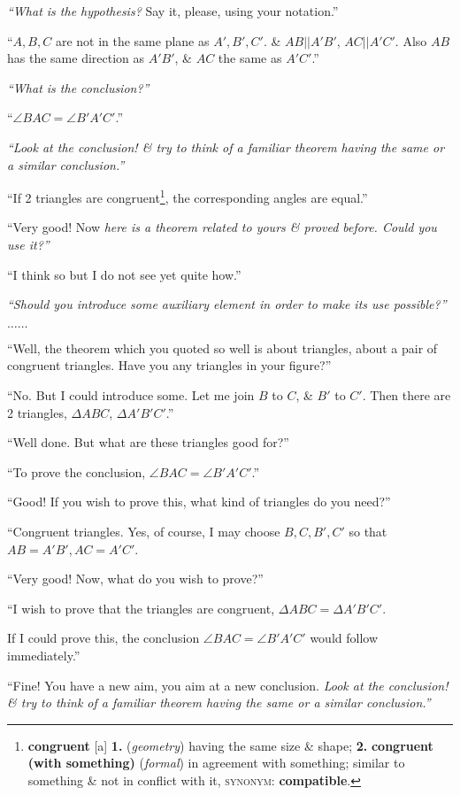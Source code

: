 \documentclass[oneside]{book}
\numberwithin{equation}{section}
\begin{document}
\textit{``What is the hypothesis?} Say it, please, using your notation.''

``$A,B,C$ are not in the same plane as $A',B',C'$. \& $AB||A'B'$, $AC||A'C'$. Also $AB$ has the same direction as $A'B'$, \& $AC$ the same as $A'C'$.''

\textit{``What is the conclusion?''}

``$\angle BAC = \angle B'A'C'$.''

\textit{``Look at the conclusion! \& try to think of a familiar theorem having the same or a similar conclusion.''}

``If 2 triangles are congruent\footnote{\textbf{congruent} [a] \textbf{1.} (\textit{geometry}) having the same size \& shape; \textbf{2.} \textbf{congruent (with something)} (\textit{formal}) in agreement with something; similar to something \& not in conflict with it, \textsc{synonym}: \textbf{compatible}.}, the corresponding angles are equal.''

``Very good! Now \textit{here is a theorem related to yours \& proved before. Could you use it?''}

``I think so but I do not see yet quite how.''

\textit{``Should you introduce some auxiliary element in order to make its use possible?''}

$\ldots\ldots$

``Well, the theorem which you quoted so well is about triangles, about a pair of congruent triangles. Have you any triangles in your figure?''

``No. But I could introduce some. Let me join $B$ to $C$, \& $B'$ to $C'$. Then there are 2 triangles, $\Delta ABC$, $\Delta A'B'C'$.''

``Well done. But what are these triangles good for?''

``To prove the conclusion, $\angle BAC = \angle B'A'C'$.''

``Good! If you wish to prove this, what kind of triangles do you need?''

``Congruent triangles. Yes, of course, I may choose $B,C,B',C'$ so that $AB = A'B',AC = A'C'$.

``Very good! Now, what do you wish to prove?''

``I wish to prove that the triangles are congruent, $\Delta ABC = \Delta A'B'C'$.

If I could prove this, the conclusion $\angle BAC = \angle B'A'C'$ would follow immediately.''

``Fine! You have a new aim, you aim at a new conclusion. \textit{Look at the conclusion! \& try to think of a familiar theorem having the same or a similar conclusion.''}
\end{document}
